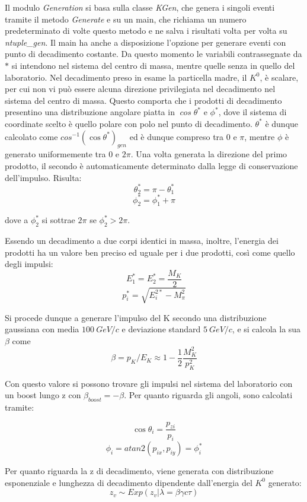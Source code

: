 \documentclass[8pt]{extarticle}
\begin{document}
Il modulo \textit{Generation} si basa sulla classe \textit{KGen}, che genera i singoli eventi tramite il metodo \textit{Generate} e su un main, che richiama un numero predeterminato di volte questo metodo e ne salva i risultati volta per volta su \textit{ntuple\_gen}. Il main ha anche a disposizione l'opzione per generare eventi con punto di decadimento costante. \medskip
Da questo momento le variabili contrassegnate da $*$ si intendono nel sistema del centro di massa, mentre quelle senza in quello del laboratorio.
Nel decadimento preso in esame la particella madre, il $K^0$, è scalare, per cui non vi può essere alcuna direzione privilegiata nel decadimento nel sistema del centro di massa. Questo comporta che i prodotti di decadimento presentino una distribuzione angolare piatta in $\mathit{\cos{\theta^*}}$ e $\mathit{\phi^*}$, dove il sistema di coordinate scelto è quello polare con polo nel punto di decadimento. $\theta^*$ è dunque calcolato come $cos^{-1}(\cos{\theta^*})_{gen}$ ed è dunque compreso tra $0$ e $\pi$, mentre $\phi$ è generato uniformemente tra $0$ e $2\pi$. Una volta generata la direzione del primo prodotto, il secondo è automaticamente determinato dalla legge di conservazione dell'impulso. Risulta: \\
$$
\theta_2^* = \pi - \theta_1^*
$$
$$
\phi_2^* = \phi_1^* + \pi
$$

dove a $\phi_2^*$ si sottrae $2\pi$ se $\phi_2^* > 2\pi$. 


Essendo un decadimento a due corpi identici in massa, inoltre, l'energia dei prodotti ha un valore ben preciso ed uguale per i due prodotti, così come quello degli impulsi: 
$$
E_1^* = E_2^* = \frac{M_K}{2}
$$
$$
p_i^* = \sqrt{E_i^{2*} - M_\pi^2}
$$

Si procede dunque a generare l'impulso del K secondo una distribuzione gaussiana con media $100\ GeV/c$ e deviazione standard $5\ GeV/c$, e si calcola la sua $\beta$ come
$$
\beta = p_K/E_K \approx 1 - \frac{1}{2} \frac{M_K^2}{p_K^2}
$$

Con questo valore si possono trovare gli impulsi nel sistema del laboratorio con un boost lungo z con $\beta_{boost} = -\beta$. 
Per quanto riguarda gli angoli, sono calcolati tramite: 

$$
\cos{\theta_i} = \frac{p_{zi}}{p_i}
$$
$$
\phi_i = atan2(p_{ix}, p_{iy}) = \phi_i^*
$$

Per quanto riguarda la z di decadimento, viene generata con distribuzione esponenziale e lunghezza di decadimento dipendente dall'energia del $K^0$ generato:
$$
z_v \sim Exp(z_v | \lambda = \beta\gamma c \tau)
$$
\end{document}
